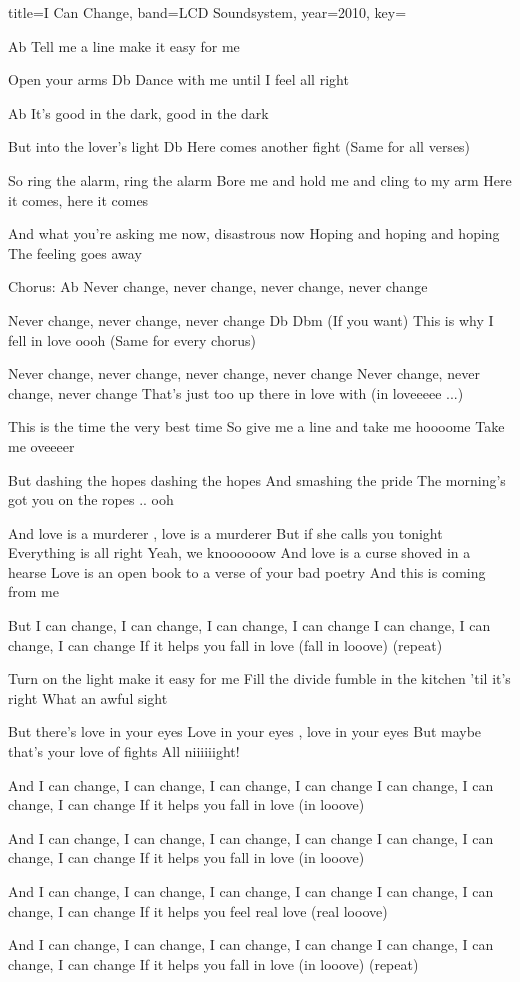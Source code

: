 \documentclass{skrul-leadsheet}
\begin{document}
\begin{song}[transpose-capo=true]{title={I Can Change}, band={LCD Soundsystem}, year={2010}, key={}}


Ab
Tell me a line make it easy for me
 
Open your arms
                                 Db
Dance with me until I feel all right
 
Ab
It's good in the dark, good in the dark
 
But into the lover's light
                      Db
Here comes another fight
(Same for all verses)
 
So ring the alarm, ring the alarm
Bore me and hold me and cling to my arm
Here it comes, here it comes
 
And what you're asking me now, disastrous now
Hoping and hoping and hoping
The feeling goes away
 
Chorus:
Ab
Never change, never change, never change, never change
 
Never change, never change, never change
                    Db     Dbm (If you want)
This is why I fell in love oooh
(Same for every chorus)
 
Never change, never change, never change, never change
Never change, never change, never change
That's just too up there in love with
(in loveeeee ...)
 
This is the time the very best time
So give me a line and take me hoooome
Take me oveeeer
 
But dashing the hopes dashing the hopes
And smashing the pride
The morning's got you on the ropes .. ooh
 
And love is a murderer , love is a murderer
But if she calls you tonight
Everything is all right
Yeah, we knoooooow
And love is a curse shoved in a hearse
Love is an open book to a verse of your bad poetry
And this is coming from me
 
But I can change, I can change, I can change, I can change
I can change, I can change, I can change
If it helps you fall in love
(fall in looove)
(repeat)
 
Turn on the light make it easy for me
Fill the divide fumble in the kitchen
'til it's right
What an awful sight
 
But there's love in your eyes
Love in your eyes , love in your eyes
But maybe that's your love of fights
All niiiiiight!
 
And I can change, I can change, I can change, I can change
I can change, I can change, I can change
If it helps you fall in love
(in looove)
 
And I can change, I can change, I can change, I can change
I can change, I can change, I can change
If it helps you fall in love
(in looove)
 
And I can change, I can change, I can change, I can change
I can change, I can change, I can change
If it helps you feel real love
(real looove)
 
And I can change, I can change, I can change, I can change
I can change, I can change, I can change
If it helps you fall in love
(in looove)
(repeat)


\end{song}
\end{document}
